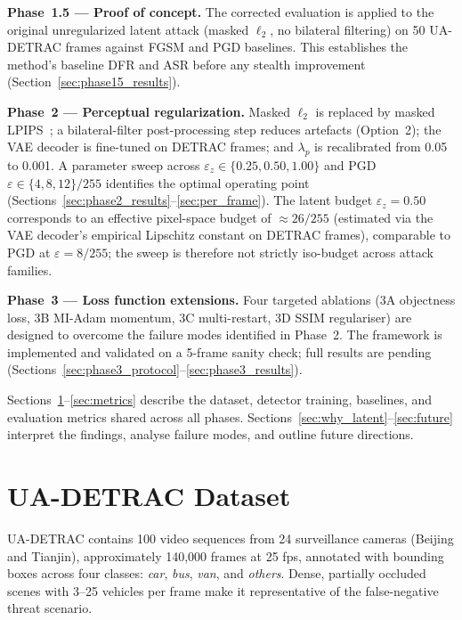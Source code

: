 \documentclass[12pt,a4paper]{report}
\begin{document}
\textbf{Phase~1.5 — Proof of concept.} The corrected evaluation is applied to
the original unregularized latent attack (masked $\ell_2$, no bilateral
filtering) on 50 UA-DETRAC frames against FGSM and PGD baselines. This
establishes the method's baseline DFR and ASR before any stealth improvement
(Section~\ref{sec:phase15_results}).

\textbf{Phase~2 — Perceptual regularization.} Masked $\ell_2$ is replaced by
masked LPIPS~\cite{zhang2018unreasonable}; a bilateral-filter post-processing step
reduces artefacts (Option~2); the VAE decoder is fine-tuned on DETRAC frames;
and $\lambda_p$ is recalibrated from 0.05 to 0.001. A parameter sweep across
$\varepsilon_z \in \{0.25, 0.50, 1.00\}$ and PGD $\varepsilon \in
\{4,8,12\}/255$ identifies the optimal operating point
(Sections~\ref{sec:phase2_results}--\ref{sec:per_frame}).
The latent budget $\varepsilon_z{=}0.50$ corresponds to an effective pixel-space
budget of $\approx26/255$ (estimated via the VAE decoder's empirical Lipschitz
constant on DETRAC frames), comparable to PGD at $\varepsilon{=}8/255$;
the sweep is therefore not strictly iso-budget across attack families.

\textbf{Phase~3 — Loss function extensions.} Four targeted ablations (3A
objectness loss, 3B MI-Adam momentum, 3C multi-restart, 3D SSIM regulariser)
are designed to overcome the failure modes identified in Phase~2. The framework
is implemented and validated on a 5-frame sanity check; full results are
pending (Sections~\ref{sec:phase3_protocol}--\ref{sec:phase3_results}).

Sections~\ref{sec:detrac}--\ref{sec:metrics} describe the dataset, detector
training, baselines, and evaluation metrics shared across all phases.
Sections~\ref{sec:why_latent}--\ref{sec:future} interpret the findings,
analyse failure modes, and outline future directions.


\section{UA-DETRAC Dataset}
\label{sec:detrac}

UA-DETRAC \cite{wen2015ua} contains 100 video sequences from 24 surveillance cameras
(Beijing and Tianjin), approximately 140,000 frames at 25 fps, annotated with bounding
boxes across four classes: \emph{car}, \emph{bus}, \emph{van}, and \emph{others}.
Dense, partially occluded scenes with 3--25 vehicles per frame make it representative
of the false-negative threat scenario.
\end{document}
